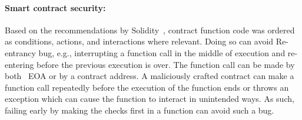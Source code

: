 \paragraph{Smart contract security:}Based on the recommendations by
Solidity~\cite{soliditySecurity}, contract function code was ordered as
conditions, actions, and interactions where relevant. Doing so can avoid
Re-entrancy bug, e.g., interrupting a function call in the middle of execution
and re-entering before the previous execution is over. The function call can be
made by both ~\ac{EOA} or by a contract address. A maliciously crafted contract
can make a function call repeatedly before the execution of the function ends
or throws an exception which can cause the function to interact in unintended
ways. As such, failing early by making the checks first in a function can avoid
such a bug. 
